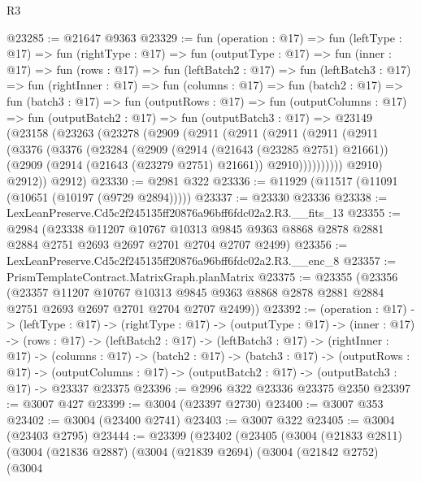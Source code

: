 \begin{lexlean}{R3}
\begin{coremodule}
@23285 := @21647 @9363
@23329 := fun (operation : @17) =>
  fun (leftType : @17) =>
  fun (rightType : @17) =>
  fun (outputType : @17) =>
  fun (inner : @17) =>
  fun (rows : @17) =>
  fun (leftBatch2 : @17) =>
  fun (leftBatch3 : @17) =>
  fun (rightInner : @17) =>
  fun (columns : @17) =>
  fun (batch2 : @17) =>
  fun (batch3 : @17) =>
  fun (outputRows : @17) =>
  fun (outputColumns : @17) =>
  fun (outputBatch2 : @17) =>
  fun (outputBatch3 : @17) =>
  @23149
    (@23158
      (@23263
        (@23278
          (@2909
            (@2911
              (@2911
                (@2911
                  (@2911
                    (@2911
                      (@3376
                        (@3376
                          (@23284
                            (@2909
                              (@2914 (@21643 (@23285 @2751) @21661))
                              (@2909 (@2914 (@21643 (@23279 @2751) @21661)) @2910))))))))))
            @2910)
          @2912))
      @2912)
@23330 := @2981 @322
@23336 := @11929 (@11517 (@11091 (@10651 (@10197 (@9729 @2894)))))
@23337 := @23330 @23336
@23338 := LexLeanPreserve.Cd5c2f245135ff20876a96bff6fdc02a2.R3.__fits_13
@23355 := @2984
    (@23338
      @11207
      @10767
      @10313
      @9845
      @9363
      @8868
      @2878
      @2881
      @2884
      @2751
      @2693
      @2697
      @2701
      @2704
      @2707
      @2499)
@23356 := LexLeanPreserve.Cd5c2f245135ff20876a96bff6fdc02a2.R3.__enc_8
@23357 := PrismTemplateContract.MatrixGraph.planMatrix
@23375 := @23355
    (@23356
      (@23357
        @11207
        @10767
        @10313
        @9845
        @9363
        @8868
        @2878
        @2881
        @2884
        @2751
        @2693
        @2697
        @2701
        @2704
        @2707
        @2499))
@23392 := (operation : @17) ->
  (leftType : @17) ->
  (rightType : @17) ->
  (outputType : @17) ->
  (inner : @17) ->
  (rows : @17) ->
  (leftBatch2 : @17) ->
  (leftBatch3 : @17) ->
  (rightInner : @17) ->
  (columns : @17) ->
  (batch2 : @17) ->
  (batch3 : @17) ->
  (outputRows : @17) ->
  (outputColumns : @17) -> (outputBatch2 : @17) -> (outputBatch3 : @17) -> @23337 @23375
@23396 := @2996 @322 @23336 @23375 @2350
@23397 := @3007 @427
@23399 := @3004 (@23397 @2730)
@23400 := @3007 @353
@23402 := @3004 (@23400 @2741)
@23403 := @3007 @322
@23405 := @3004 (@23403 @2795)
@23444 := @23399
    (@23402
      (@23405
        (@3004
          (@21833 @2811)
          (@3004
            (@21836 @2887)
            (@3004
              (@21839 @2694)
              (@3004
                (@21842 @2752)
                (@3004

\end{coremodule}
\end{lexlean}
